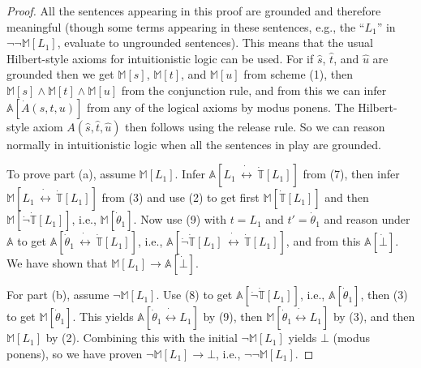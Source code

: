 \documentclass{amsart}
\theoremstyle{definition}
\begin{document}
\begin{proof}
All the sentences appearing in this proof are grounded and therefore meaningful (though some terms appearing in these sentences, e.g., the ``$L_1$'' in $\neg\neg\mathbb{M}[L_1]$, evaluate to ungrounded sentences). This means that the usual Hilbert-style axioms for intuitionistic logic can be used. For if $\hat{s}$, $\hat{t}$, and $\hat{u}$ are grounded then we get $\mathbb{M}[s]$, $\mathbb{M}[t]$, and $\mathbb{M}[u]$ from scheme (1), then $\mathbb{M}[s] \wedge \mathbb{M}[t] \wedge \mathbb{M}[u]$ from the conjunction rule, and from this we can infer $\mathbb{A}[\dot{A}(s,t,u)]$ from any of the logical axioms by modus ponens. The Hilbert-style axiom $A(\hat{s}, \hat{t}, \hat{u})$ then follows using the release rule. So we can reason normally in intuitionistic logic when all the sentences in play are grounded.

To prove part (a), assume $\mathbb{M}[L_1]$. Infer $\mathbb{A}[L_1\, \dot{\leftrightarrow}\, \dot{\mathbb{T}}[L_1]]$ from (7), then infer $\mathbb{M}[L_1\, \dot{\leftrightarrow}\, \dot{\mathbb{T}}[L_1]]$ from (3) and use (2) to get first $\mathbb{M}[\dot{\mathbb{T}}[L_1]]$ and then $\mathbb{M}[\dot{\neg}\dot{\mathbb{T}}[L_1]]$, i.e., $\mathbb{M}[\dot{\theta}_1]$. Now use (9) with $t = L_1$ and $t' = \dot{\theta}_1$ and reason under $\mathbb{A}$ to get $\mathbb{A}[\dot{\theta}_1\, \dot{\leftrightarrow}\, \dot{\mathbb{T}}[L_1]]$, i.e., $\mathbb{A}[\dot{\neg}\dot{\mathbb{T}}[L_1] \, \dot{\leftrightarrow}\, \dot{\mathbb{T}}[L_1]]$, and from this $\mathbb{A}[\dot{\bot}]$. We have shown that $\mathbb{M}[L_1] \to \mathbb{A}[\dot{\bot}]$.

For part (b), assume $\neg\mathbb{M}[L_1]$. Use (8) to get $\mathbb{A}[\dot{\neg}\dot{\mathbb{T}}[L_1]]$, i.e., $\mathbb{A}[\dot{\theta}_1]$, then (3) to get $\mathbb{M}[\dot{\theta}_1]$. This yields $\mathbb{A}[\dot{\theta}_1 \dot{\leftrightarrow} L_1]$ by (9), then $\mathbb{M}[\dot{\theta}_1 \dot{\leftrightarrow} L_1]$ by (3), and then $\mathbb{M}[L_1]$ by (2). Combining this with the initial $\neg\mathbb{M}[L_1]$ yields $\bot$ (modus ponens), so we have proven $\neg\mathbb{M}[L_1] \to \bot$, i.e., $\neg\neg\mathbb{M}[L_1]$.


\end{proof}
\end{document}
